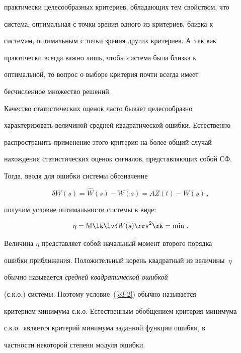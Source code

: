 практически целесообразных критериев, обладающих тем свойством, что


система, оптимальная с точки зрения одного из критериев, близка к


системам, оптимальным с точки зрения других критериев. А~так как


практически всегда важно лишь, чтобы система была близка к


оптимальной, то вопрос о выборе критерия почти всегда имеет


бесчисленное множество решений.





Качество  статистических оценок часто бывает целесообразно


характеризовать величиной средней квадратической ошибки. Естественно


распространить применение этого критерия на более общий случай


нахождения статистических оценок  сигналов, представляющих собой СФ.


Тогда, вводя для ошибки системы обозначение


\begin{equation*}


\delta W(s) =\hat W(s) - W(s) = AZ(t) - W(s)\,,




\end{equation*}


получим условие оптимальности системы в виде:


\begin{equation}


\eta =\mathrm{M} \lk \lv\delta W(s)\rrv^2 \rk =\min\,.\label{e3-2}


\end{equation}


Величина $\eta$ представляет собой начальный момент второго порядка


ошибки приближения. Положительный корень квадратный из величины~$\eta$ 


обычно называется  \textit{средней квадратической ошибкой}


(с.к.о.) системы. Поэтому условие~(\ref{e3-2}) обычно называется


критерием минимума с.к.о. Естественным обобщением критерия минимума


с.к.о.\ является критерий минимума заданной функции ошибки, в


частности некоторой степени модуля ошибки.





